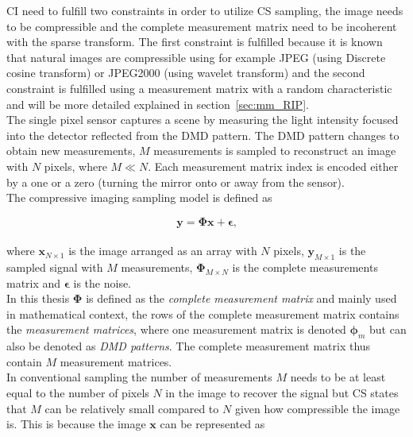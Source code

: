 CI need to fulfill two constraints in order to utilize CS sampling,  the image needs to be compressible and the complete measurement matrix need to be incoherent with the sparse transform. The first constraint is fulfilled because it is known that natural images are compressible using for example JPEG (using Discrete cosine transform) or JPEG2000 (using wavelet transform) and the second constraint is fulfilled using a measurement matrix with a random characteristic and will be more detailed explained in section~\ref{sec:mm_RIP}.\\[0.1in]
 

The single pixel sensor captures a scene by measuring the light intensity focused into the detector reflected from the DMD pattern. The DMD pattern changes to obtain new measurements, $M$  measurements is sampled to reconstruct an image with $N$ pixels, where $M \ll N$. Each measurement matrix index is encoded either  by a one or a zero (turning the mirror onto or away from the sensor).\\[0.1in] 

The compressive imaging sampling model is defined as

\begin{equation}
\label{eq:CS1}
   \mathbf{ y = \Phi x + \epsilon}\text{,}
\end{equation}\\[0.1in]


where $\mathbf{x}_{N\times1}$ is the image arranged as an array with $N$ pixels, $\mathbf{y}_{M\times1}$ is the sampled signal with $M$ measurements, $\mathbf{\Phi}_{M \times N}$ is the complete measurements matrix and $\mathbf{\epsilon}$ is the noise.\\[0.1in] 

In this thesis $\mathbf{\Phi}$ is defined as the \textit{complete measurement matrix} and mainly used in mathematical context, the rows of the complete measurement matrix contains the \textit{measurement matrices}, where one measurement matrix is denoted $\mathbf{\phi}_m$ but can also be denoted as \textit{DMD patterns}. The complete measurement matrix thus contain $M$ measurement matrices.\\[0.1in]


In conventional sampling the number of measurements $M$ needs to be at least equal to the number of pixels $N$ in the image to recover the signal but CS states that $M$ can be relatively small compared to $N$ given how compressible the image is. This is because the image $\mathbf{x}$ can be represented as  

